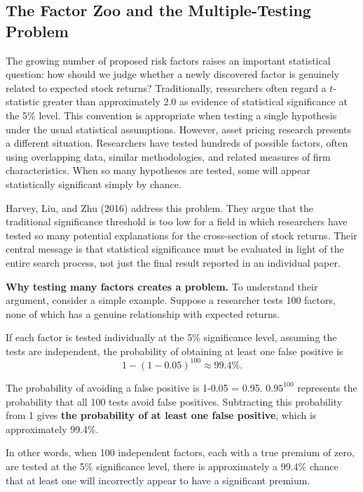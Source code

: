 \subsection{The Factor Zoo and the Multiple-Testing Problem}
\label{sec:04-multiple-testing}

The growing number of proposed risk factors raises an important
statistical question: how should we judge whether a newly discovered
factor is genuinely related to expected stock returns? Traditionally,
researchers often regard a $t$-statistic greater than approximately
2.0 as evidence of statistical significance at the 5\% level. This
convention is appropriate when testing a single hypothesis under the
usual statistical assumptions. However, asset pricing research
presents a different situation. Researchers have tested hundreds
of possible factors, often using overlapping data, similar
methodologies, and related measures of firm characteristics. When
so many hypotheses are tested, some will appear statistically
significant simply by chance.

Harvey, Liu, and Zhu (2016)
address this problem. They argue that the traditional significance
threshold is too low for a field in which researchers have tested
so many potential explanations for the cross-section of stock
returns. Their central message is that statistical significance
must be evaluated in light of the entire search process, not just
the final result reported in an individual paper.

\textbf{Why testing many factors creates a problem.}
To understand their argument, consider a simple example. Suppose
a researcher tests 100 factors, none of which has a genuine
relationship with expected returns. 

If each factor is tested
individually at the 5\% significance level, assuming
the tests are independent, the probability of obtaining at least
one false positive is
\begin{equation}
  1-(1-0.05)^{100} \approx 99.4\%. \nonumber
\end{equation}

The probability of avoiding a false positive is 1-0.05 = 0.95. 
$0.95^{100}$ represents the probability that all 100 tests avoid false positives. 
Subtracting this probability from 1 gives \textbf{the probability of at least one false positive}, which is approximately 99.4\%.

In other words, when 100 independent factors, each with a true premium of zero, are tested at the 5\% significance level, 
there is approximately a 99.4\% 
chance that at least one will incorrectly appear to have a significant premium.

